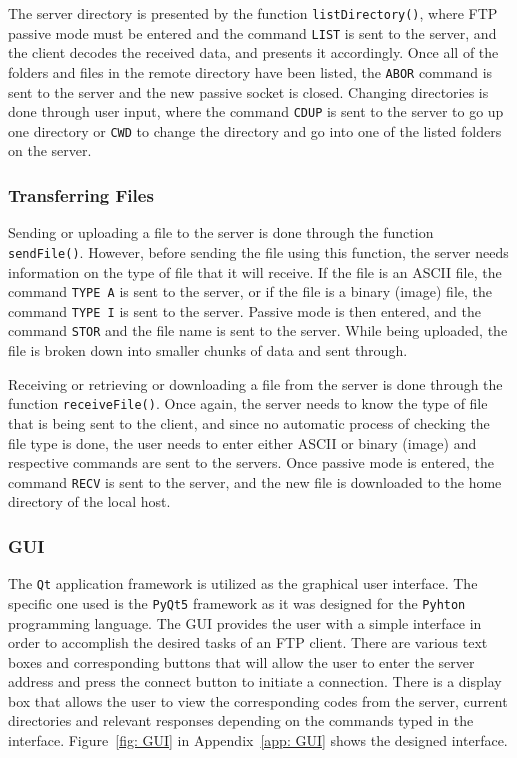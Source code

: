 \documentclass[10pt,twocolumn]{witseiepaper}
\def\code#1{\texttt{#1}}
\begin{document}
The server directory is presented by the function \code{listDirectory()}, where FTP passive mode must be entered and the command \code{LIST} is sent to the server, and the client decodes the received data, and presents it accordingly. Once all of the folders and files in the remote directory have been listed, the \code{ABOR} command is sent to the server and the new passive socket is closed. Changing directories is done through user input, where the command \code{CDUP} is sent to the server to go up one directory or \code{CWD} to change the directory and go into one of the listed folders on the server.

\subsubsection{Transferring Files}
\label{sec: Transferring Files}
Sending or uploading a file to the server is done through the function \code{sendFile()}. However, before sending the file using this function, the server needs information on the type of file that it will receive. If the file is an ASCII file, the command \code{TYPE A} is sent to the server, or if the file is a binary (image) file, the command \code{TYPE I} is sent to the server. Passive mode is then entered, and the command \code{STOR} and the file name is sent to the server. While being uploaded, the file is broken down into smaller chunks of data and sent through.

Receiving or retrieving or downloading a file from the server is done through the function \code{receiveFile()}. Once again, the server needs to know the type of file that is being sent to the client, and since no automatic process of checking the file type is done, the user needs to enter either ASCII or binary (image) and respective commands are sent to the servers. Once passive mode is entered, the command \code{RECV} is sent to the server, and the new file is downloaded to the home directory of the local host.

\subsubsection{GUI}
\label{sec: GUI}
The \code{Qt} application framework is utilized as the graphical user interface. The specific one used is the \code{PyQt5} framework as it was designed for the \code{Pyhton} programming language. The GUI provides the user with a simple interface in order to accomplish the desired tasks of an FTP client. There are various text boxes and corresponding buttons that will allow the user to enter the server address and press the connect button to initiate a connection. There is a display box that allows the user to view the corresponding codes from the server, current directories and relevant responses depending on the commands typed in the interface. Figure~\ref{fig: GUI} in Appendix~\ref{app: GUI} shows the designed interface.
\end{document}
